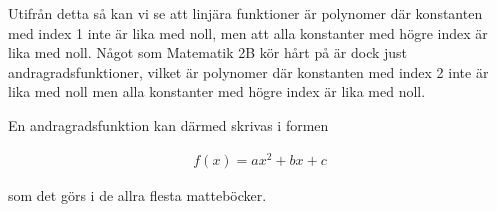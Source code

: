 Utifrån detta så kan vi se att linjära funktioner är polynomer där konstanten med index 1 inte är lika med noll, men att alla konstanter med högre index är lika med noll. Något som Matematik 2B kör hårt på är dock just andragradsfunktioner, vilket är polynomer där konstanten med index 2 inte är lika med noll men alla konstanter med högre index är lika med noll.

En andragradsfunktion kan därmed skrivas i formen

\begin{align}
	f(x) = ax^2 + bx + c
\end{align}

som det görs i de allra flesta matteböcker.








































































